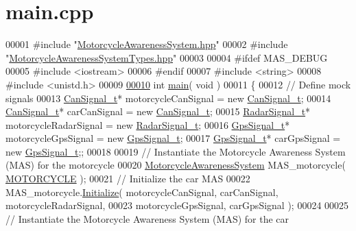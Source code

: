 \hypertarget{main_8cpp_source}{\section{main.\-cpp}
}

\begin{DoxyCode}
00001 \textcolor{preprocessor}{#include "\hyperlink{MotorcycleAwarenessSystem_8hpp}{MotorcycleAwarenessSystem.hpp}"}
00002 \textcolor{preprocessor}{#include "\hyperlink{MotorcycleAwarenessSystemTypes_8hpp}{MotorcycleAwarenessSystemTypes.hpp}"}
00003 
00004 \textcolor{preprocessor}{#ifdef MAS\_DEBUG}
00005 \textcolor{preprocessor}{}\textcolor{preprocessor}{#include <iostream>}
00006 \textcolor{preprocessor}{#endif}
00007 \textcolor{preprocessor}{}\textcolor{preprocessor}{#include <string>}
00008 \textcolor{preprocessor}{#include <unistd.h>}
00009 
\hypertarget{main_8cpp_source_l00010}{}\hyperlink{main_8cpp_a840291bc02cba5474a4cb46a9b9566fe}{00010} \textcolor{keywordtype}{int} \hyperlink{main_8cpp_a840291bc02cba5474a4cb46a9b9566fe}{main}( \textcolor{keywordtype}{void} )
00011 \{
00012     \textcolor{comment}{// Define mock signals}
00013     \hyperlink{structCanSignal__t}{CanSignal\_t}* motorcycleCanSignal = \textcolor{keyword}{new} \hyperlink{structCanSignal__t}{CanSignal\_t};
00014     \hyperlink{structCanSignal__t}{CanSignal\_t}* carCanSignal = \textcolor{keyword}{new} \hyperlink{structCanSignal__t}{CanSignal\_t};
00015     \hyperlink{structRadarSignal__t}{RadarSignal\_t}* motorcycleRadarSignal = \textcolor{keyword}{new} \hyperlink{structRadarSignal__t}{RadarSignal\_t};
00016     \hyperlink{structGpsSignal__t}{GpsSignal\_t}* motorcycleGpsSignal = \textcolor{keyword}{new} \hyperlink{structGpsSignal__t}{GpsSignal\_t};
00017     \hyperlink{structGpsSignal__t}{GpsSignal\_t}* carGpsSignal = \textcolor{keyword}{new} \hyperlink{structGpsSignal__t}{GpsSignal\_t};;
00018 
00019     \textcolor{comment}{// Instantiate the Motorcycle Awareness System (MAS) for the motorcycle}
00020     \hyperlink{classMotorcycleAwarenessSystem}{MotorcycleAwarenessSystem} MAS\_motorcycle( 
      \hyperlink{MotorcycleAwarenessSystemTypes_8hpp_a0c05c42b98a847f971385c81c2a81afaa39b983b1f7acfc4e7c900d77b0fded6a}{MOTORCYCLE} );
00021     \textcolor{comment}{// Initialize the car MAS}
00022     MAS\_motorcycle.\hyperlink{classMotorcycleAwarenessSystem_a55f1ea16b6311120ea42b460fb8b3a71}{Initialize}( motorcycleCanSignal, carCanSignal, motorcycleRadarSignal,
00023                                           motorcycleGpsSignal, carGpsSignal );
00024 
00025     \textcolor{comment}{// Instantiate the Motorcycle Awareness System (MAS) for the car}

\end{DoxyCode}
